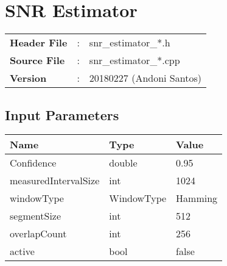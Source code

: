 \clearpage

\section{SNR Estimator}

\begin{refsection}

\begin{tcolorbox}	
	\begin{tabular}{p{2.75cm} p{0.2cm} p{10.5cm}} 	
		\textbf{Header File}   &:& snr\_estimator\_*.h \\
		\textbf{Source File}   &:& snr\_estimator\_*.cpp \\
		\textbf{Version}	   &:& 20180227 (Andoni Santos)
	\end{tabular}
\end{tcolorbox}

\subsection*{Input Parameters}

\begin{table}[H]
	\centering
	\begin{tabular}{|l|l|l|}
		\hline
		\textbf{Name}  		 & \textbf{Type}  & \textbf{Value}    	\\\hline
		Confidence     		 & double         & 0.95              	\\\hline
		measuredIntervalSize & int 			  & 1024				\\\hline
		windowType			 & WindowType     & Hamming			  	\\\hline
		segmentSize			 & int			  & 512					\\\hline
		overlapCount  		 & int			  & 256					\\\hline
		active             & bool       & false \\\hline
	\end{tabular}
\end{table}



\end{refsection}
